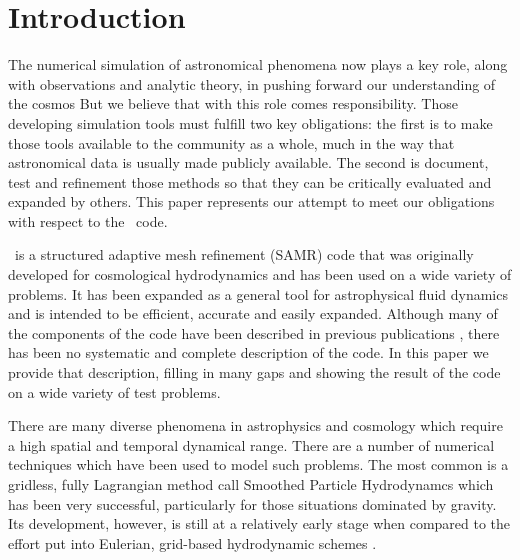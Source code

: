 
\section{Introduction}\label{sec.intro}

The numerical simulation of astronomical phenomena now plays a key role, along with observations and analytic theory, in pushing forward our understanding of the cosmos 
But we believe that with this role comes responsibility.  Those developing simulation tools must fulfill two key obligations: the first is to make those tools available to the community as a whole, much in the way that astronomical data is usually made publicly available.  The second is document, test and refinement those methods so that they can be critically evaluated and expanded by others.  This paper represents our attempt to meet our obligations with respect to the \enzo\ code.

\enzo\ is a structured adaptive mesh refinement (SAMR) code that was originally developed for cosmological hydrodynamics and has been used on a wide variety of problems.  It has been expanded as a general tool for astrophysical fluid dynamics and is intended to be efficient, accurate and easily expanded.  Although many of the components of the code have been described in previous publications \citep{1995CoPhC..89..149B, BryanThesis96, Bryan97a, Bryan97b, Norman99, BryanCompSci99, Bryan01, Oshea04}, there has been no systematic and complete description of the code.  In this paper we provide that description, filling in many gaps and showing the result of the code on a wide variety of test problems.

There are many diverse phenomena in astrophysics and cosmology which require a high spatial and temporal dynamical range. There are a number of numerical techniques which have been used to
model such problems.  The most common is a gridless, fully Lagrangian method call Smoothed Particle Hydrodynamcs \citep[SPH;][]{Lucy77, SPH} which has been very successful, particularly for those situations dominated by gravity.  Its development, however, is still at a relatively early stage when
compared to the effort put into Eulerian, grid-based hydrodynamic schemes \citep{Woodward84}. 

